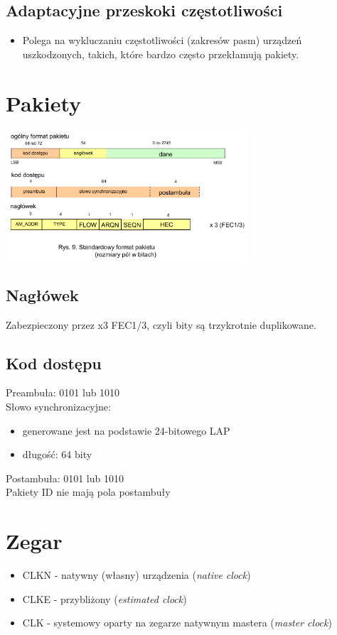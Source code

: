 \subsection{Adaptacyjne przeskoki częstotliwości}
\begin{itemize}
	\item Polega na wykluczaniu częstotliwości (zakresów pasm) urządzeń uszkodzonych, takich, które bardzo często przekłamują pakiety.
\end{itemize}

\section{Pakiety}
\includegraphics[width=9cm]{./wyklady/Rysunek05.pdf}
\subsection{Nagłówek}
Zabezpieczony przez x3 FEC1/3, czyli bity są trzykrotnie duplikowane.\\
\subsection{Kod dostępu}
Preambuła: 0101 lub 1010\\
Słowo synchronizacyjne:
\begin{itemize}
	\item generowane jest na podstawie 24-bitowego LAP
	\item długość: 64 bity
\end{itemize}
Postambuła: 0101 lub 1010\\
Pakiety ID nie mają pola postambuły

\section{Zegar}
\begin{itemize}
	\item CLKN - natywny (własny) urządzenia (\emph{native clock})
	\item CLKE - przybliżony (\emph{estimated clock})
	\item CLK - systemowy oparty na zegarze natywnym mastera (\emph{master clock})
\end{itemize}

